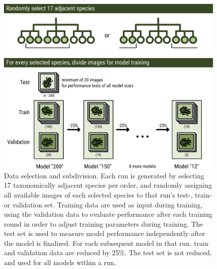 \documentclass{article}
\begin{document}
\begin{figure}[!ht]
  \includegraphics[width=\textwidth]{5}
  \caption{\footnotesize Data selection and subdivision. Each run is generated by selecting 17 taxonomically adjacent species per order, and randomly assigning all available images of each selected species to that run's test-, train- or validation set. Training data are used as input during training, using the validation data to evaluate performance after each training round in order to adjust training parameters during training. The test set is used to measure model performance independently after the model is finalized\autocite{Goodfellow-et-al-2016}. For each subsequent model in that run, train and validation data are reduced by 25\%. The test set is not reduced, and used for all models within a run.}
  \label{fig:workflow}
\end{figure}
\end{document}
